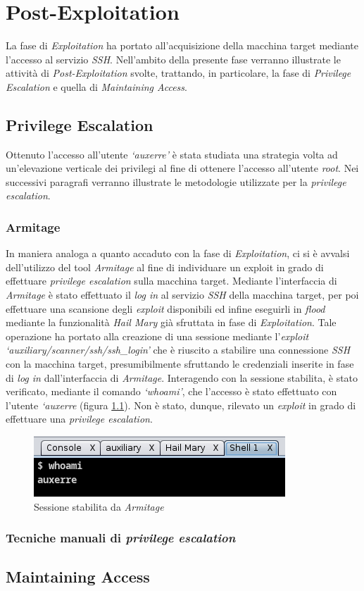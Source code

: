 
\chapter{Post-Exploitation}
La fase di \emph{Exploitation} ha portato all'acquisizione della macchina target mediante l'accesso al servizio \emph{SSH}. Nell'ambito della presente fase verranno illustrate le attività di \emph{Post-Exploitation} svolte, trattando, in particolare, la fase di \emph{Privilege Escalation} e quella di \emph{Maintaining Access}. 
\section{Privilege Escalation}
Ottenuto l'accesso all'utente \emph{`auxerre'} è stata studiata una strategia volta ad un'elevazione verticale dei privilegi al fine di ottenere l'accesso all'utente \emph{root}. Nei successivi paragrafi verranno illustrate le metodologie utilizzate per la \emph{privilege escalation}.
\subsection{Armitage}
In maniera analoga a quanto accaduto con la fase di \emph{Exploitation}, ci si è avvalsi dell'utilizzo del tool \emph{Armitage} al fine di individuare un exploit in grado di effettuare \emph{privilege escalation} sulla macchina target. Mediante l'interfaccia di \emph{Armitage} è stato effettuato il \emph{log in} al servizio \emph{SSH} della macchina target, per poi effettuare una scansione degli \emph{exploit} disponibili ed infine eseguirli in \emph{flood} mediante la funzionalità \emph{Hail Mary} già sfruttata in fase di \emph{Exploitation}. Tale operazione ha portato alla creazione di una sessione mediante l'\emph{exploit} \emph{`auxiliary/scanner/ssh/ssh\_login'} che è riuscito a stabilire una connessione \emph{SSH} con la macchina target, presumibilmente sfruttando le credenziali inserite in fase di \emph{log in} dall'interfaccia di \emph{Armitage}. Interagendo con la sessione stabilita, è stato verificato, mediante il comando \emph{`whoami'}, che l'accesso è stato effettuato con l'utente \emph{`auxerre} (figura \ref{fig:armitage_ssh}). Non è stato, dunque, rilevato un \emph{exploit} in grado di effettuare una \emph{privilege escalation}.
\begin{figure}[h]
    \centering
    \includegraphics[scale=1]{capitoli/images/armitage_ssh.png}
    \caption{Sessione stabilita da \emph{Armitage}}
    \label{fig:armitage_ssh}
\end{figure}
\subsection{Tecniche manuali di \emph{privilege escalation}}

\section{Maintaining Access}
